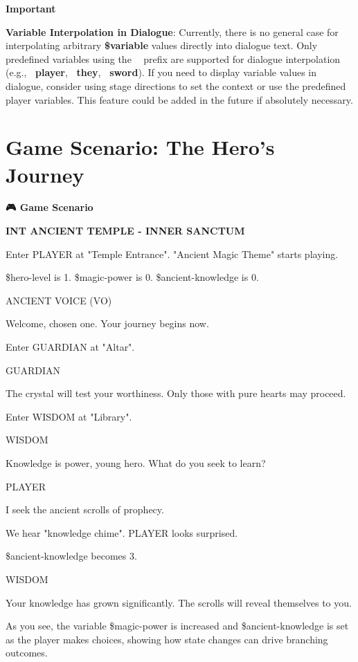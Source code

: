 \documentclass[11pt,letterpaper,oldstylefigures]{memoir}
\newcommand{\slugline}[1]{\nobreak\textbf{\MakeUppercase{#1}}\par\nobreak\vspace{1\baselineskip}}
\newcommand{\speaker}[1]{\nobreak\hspace*{0.333\textwidth}\MakeUppercase{#1}\par\nobreak\vspace{0.5\baselineskip}}
\newcommand{\dialogue}[1]{\nobreak\hspace*{0.25\textwidth}\begin{minipage}{0.5\textwidth}#1\end{minipage}\par\vspace{1\baselineskip}}
\newcommand{\stagedir}[1]{#1\par\vspace{1\baselineskip}}
\newenvironment{FountainExample}
  {\begingroup
  \ttfamily\small
   \setlength{\parindent}{0pt}
  \setlength{\parskip}{0.5em}
  \allowdisplaybreaks
  \setlength{\displaywidowpenalty}{0}
  \setlength{\widowpenalty}{0}
  \setlength{\clubpenalty}{0}
  \setlength{\interlinepenalty}{0}
}
  {\endgroup}
\newenvironment{GameScenario}
{\begingroup
\small
\setlength{\parindent}{0pt}
\setlength{\parskip}{0.5em}
\allowdisplaybreaks
\setlength{\displaywidowpenalty}{0}
\setlength{\widowpenalty}{0}
\setlength{\clubpenalty}{0}
\setlength{\interlinepenalty}{0}
\begin{tcolorbox}[
    colback=orange!5,
    colframe=orange!75!black,
    boxrule=0.5pt,
    arc=2pt,
    left=0.5em,
    right=0.5em,
    top=0.25em,
    bottom=0.25em
]
\textbf{🎮 Game Scenario}
\end{tcolorbox}\par
}
{\endgroup}
\newenvironment{Important}
{\begingroup
\small
\setlength{\parindent}{0pt}
\setlength{\parskip}{0.5em}
\allowdisplaybreaks
\setlength{\displaywidowpenalty}{0}
\setlength{\widowpenalty}{0}
\setlength{\clubpenalty}{0}
\setlength{\interlinepenalty}{0}
\begin{tcolorbox}[
    colback=yellow!5,
    colframe=yellow!75!black,
    boxrule=0.5pt,
    arc=2pt,
    left=0.5em,
    right=0.5em,
    top=0.25em,
    bottom=0.25em
]
\textbf{Important}
\end{tcolorbox}\par
}
{\endgroup}
\newcommand{\paragraphbreak}{\vspace{0.5em}}
\newcommand{\fountain}[1]{\textbf{#1}}
\begin{document}
\paragraphbreak

\begin{Important}
\textbf{Variable Interpolation in Dialogue}: Currently, there is no general case for interpolating arbitrary \fountain{\$variable} values directly into dialogue text. Only predefined variables using the \fountain{~} prefix are supported for dialogue interpolation (e.g., \fountain{~player}, \fountain{~they}, \fountain{~sword}). If you need to display variable values in dialogue, consider using stage directions to set the context or use the predefined player variables. This feature could be added in the future if absolutely necessary.
\end{Important}

\section{Game Scenario: The Hero's Journey}

\begin{GameScenario}
\begin{FountainExample}
\slugline{INT ANCIENT TEMPLE - INNER SANCTUM}

\stagedir{Enter PLAYER at "Temple Entrance". "Ancient Magic Theme" starts playing.}

\stagedir{\$hero-level is 1. \$magic-power is 0. \$ancient-knowledge is 0.}

\speaker{ANCIENT VOICE (VO)}
\dialogue{Welcome, chosen one. Your journey begins now.}

\stagedir{Enter GUARDIAN at "Altar".}

\speaker{GUARDIAN}
\dialogue{The crystal will test your worthiness. Only those with pure hearts may proceed.}

\stagedir{Enter WISDOM at "Library".}

\speaker{WISDOM}
\dialogue{Knowledge is power, young hero. What do you seek to learn?}

\speaker{PLAYER}
\dialogue{I seek the ancient scrolls of prophecy.}

\stagedir{We hear "knowledge chime". PLAYER looks surprised.}
\stagedir{\$ancient-knowledge becomes 3.}

\speaker{WISDOM}
\dialogue{Your knowledge has grown significantly. The scrolls will reveal themselves to you.}
\end{FountainExample}
\end{GameScenario}

As you see, the variable \$magic-power is increased and \$ancient-knowledge is set as the player makes choices, showing how state changes can drive branching outcomes.
\end{document}
